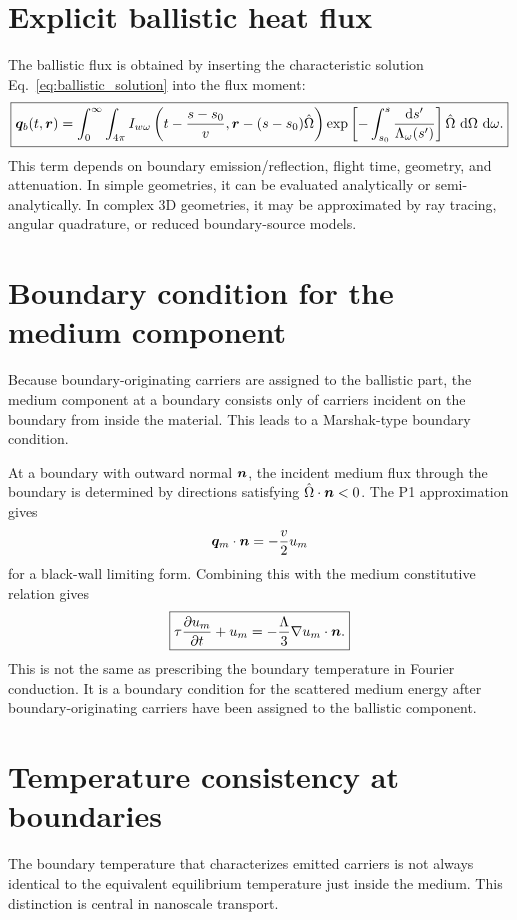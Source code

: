 \documentclass[11pt]{article}
\begin{document}
\section{Explicit ballistic heat flux}
The ballistic flux is obtained by inserting the characteristic solution Eq.~\eqref{eq:ballistic_solution} into the flux moment:
\begin{equation}
    \boxed{\bm{q}_b(t,\bm{r})=\int_0^\infty\int_{4\pi}
    I_{w\omega}\left(t-\frac{s-s_0}{v},\bm{r}-(s-s_0)\hat{\Omega}\right)
    \exp\left[-\int_{s_0}^{s}\frac{\mathop{}\!\mathrm{d} s'}{\Lambda_\omega(s')}\right]
    \hat{\Omega}\,\mathop{}\!\mathrm{d}\Omega\,\mathop{}\!\mathrm{d}\omega.}
    \label{eq:ballistic_flux_general}
\end{equation}
This term depends on boundary emission/reflection, flight time, geometry, and attenuation. In simple geometries, it can be evaluated analytically or semi-analytically. In complex 3D geometries, it may be approximated by ray tracing, angular quadrature, or reduced boundary-source models.

\section{Boundary condition for the medium component}
Because boundary-originating carriers are assigned to the ballistic part, the medium component at a boundary consists only of carriers incident on the boundary from inside the material. This leads to a Marshak-type boundary condition.

At a boundary with outward normal \(\bm{n}\), the incident medium flux through the boundary is determined by directions satisfying \(\hat{\Omega}\cdot\bm{n}<0\). The P1 approximation gives
\begin{equation}
    \bm{q}_m\cdot\bm{n}=-\frac{v}{2}u_m
    \label{eq:marshak_flux_relation}
\end{equation}
for a black-wall limiting form. Combining this with the medium constitutive relation gives
\begin{equation}
    \boxed{\tau\frac{\partial u_m}{\partial t}+u_m
    =-\frac{\Lambda}{3}\nabla u_m\cdot\bm{n}.}
    \label{eq:marshak_um}
\end{equation}
This is not the same as prescribing the boundary temperature in Fourier conduction. It is a boundary condition for the scattered medium energy after boundary-originating carriers have been assigned to the ballistic component.

\section{Temperature consistency at boundaries}
The boundary temperature that characterizes emitted carriers is not always identical to the equivalent equilibrium temperature just inside the medium. This distinction is central in nanoscale transport.
\end{document}

